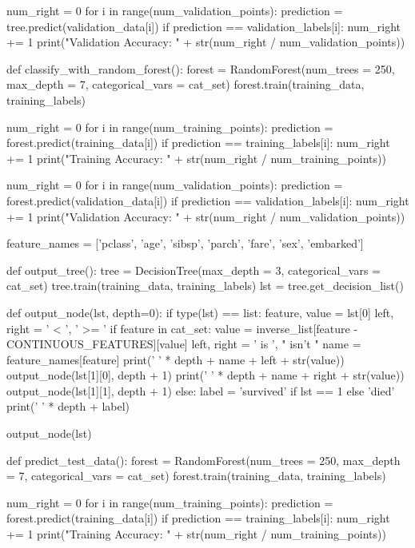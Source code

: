 \documentclass{article}
\begin{document}
\begin{python}
    num_right = 0
    for i in range(num_validation_points):
        prediction = tree.predict(validation_data[i])
        if prediction == validation_labels[i]:
            num_right += 1
    print("Validation Accuracy: " + str(num_right / num_validation_points))

def classify_with_random_forest():
    forest = RandomForest(num_trees = 250, max_depth = 7, categorical_vars = cat_set)
    forest.train(training_data, training_labels)

    num_right = 0
    for i in range(num_training_points):
        prediction = forest.predict(training_data[i])
        if prediction == training_labels[i]:
            num_right += 1
    print("Training Accuracy: " + str(num_right / num_training_points))

    num_right = 0
    for i in range(num_validation_points):
        prediction = forest.predict(validation_data[i])
        if prediction == validation_labels[i]:
            num_right += 1
    print("Validation Accuracy: " + str(num_right / num_validation_points))

feature_names = ['pclass', 'age', 'sibsp', 'parch', 'fare', 'sex', 'embarked']

def output_tree():
    tree = DecisionTree(max_depth = 3, categorical_vars = cat_set)
    tree.train(training_data, training_labels)
    lst = tree.get_decision_list()

    def output_node(lst, depth=0):
        if type(lst) == list:
            feature, value = lst[0]
            left, right = ' < ', ' >= '
            if feature in cat_set:
                value = inverse_list[feature - CONTINUOUS_FEATURES][value]
                left, right = ' is ', " isn't "
            name = feature_names[feature]
            print('    ' * depth + name + left + str(value))
            output_node(lst[1][0], depth + 1)
            print('    ' * depth + name + right + str(value))
            output_node(lst[1][1], depth + 1)
        else:
            label = 'survived' if lst == 1 else 'died'
            print('    ' * depth + label)

    output_node(lst)

def predict_test_data():
    forest = RandomForest(num_trees = 250, max_depth = 7, categorical_vars = cat_set)
    forest.train(training_data, training_labels)

    num_right = 0
    for i in range(num_training_points):
        prediction = forest.predict(training_data[i])
        if prediction == training_labels[i]:
            num_right += 1
    print("Training Accuracy: " + str(num_right / num_training_points))


\end{python}
\end{document}
